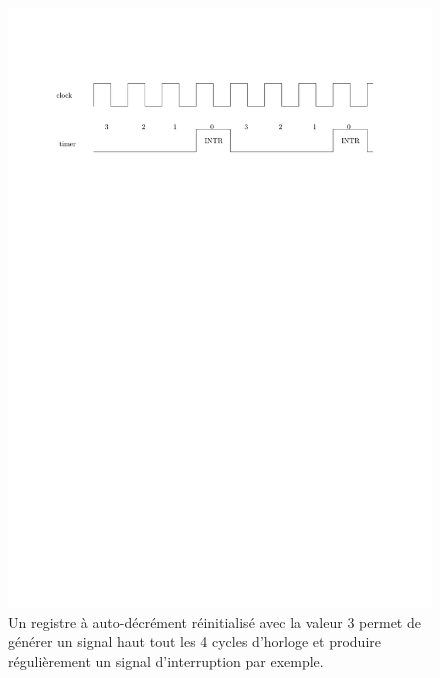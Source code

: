 \begin{figure}[htbp]
\includegraphics[width=\linewidth]{Figs/timer_waveform.pdf}
\caption{\label{fig:timer_waveform} Un registre à auto-décrément réinitialisé avec la valeur $3$ permet de générer un signal haut tout les 4 cycles d'horloge et produire régulièrement un signal d'interruption par exemple.}
\end{figure}

